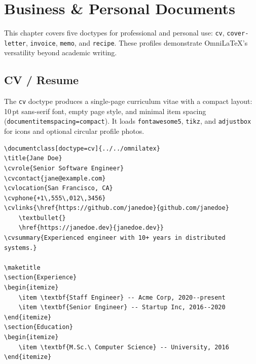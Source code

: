 \chapter{Business \& Personal Documents}
\label{ch:business}

This chapter covers five doctypes for professional and personal use:
\texttt{cv}, \texttt{cover-letter}, \texttt{invoice}, \texttt{memo}, and
\texttt{recipe}.  These profiles demonstrate OmniLaTeX's versatility beyond
academic writing.

\section{CV / Resume}
\label{sec:cv}

The \texttt{cv} doctype produces a single-page curriculum vitae with a
compact layout: 10\,pt sans-serif font, empty page style, and minimal
item spacing (\texttt{documentitemspacing=compact}).  It loads
\texttt{fontawesome5}, \texttt{tikz}, and \texttt{adjustbox} for icons
and optional circular profile photos.

\begin{verbatim}
\documentclass[doctype=cv]{../../omnilatex}
\title{Jane Doe}
\cvrole{Senior Software Engineer}
\cvcontact{jane@example.com}
\cvlocation{San Francisco, CA}
\cvphone{+1\,555\,012\,3456}
\cvlinks{\href{https://github.com/janedoe}{github.com/janedoe}
    \textbullet{}
    \href{https://janedoe.dev}{janedoe.dev}}
\cvsummary{Experienced engineer with 10+ years in distributed systems.}

\maketitle
\section{Experience}
\begin{itemize}
    \item \textbf{Staff Engineer} -- Acme Corp, 2020--present
    \item \textbf{Senior Engineer} -- Startup Inc, 2016--2020
\end{itemize}
\section{Education}
\begin{itemize}
    \item \textbf{M.Sc.\ Computer Science} -- University, 2016
\end{itemize}

\end{verbatim}


